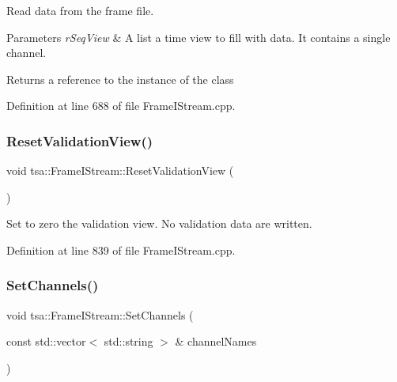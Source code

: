 Read data from the frame file.


\begin{DoxyParams}{Parameters}
{\em r\+Seq\+View} & A list a time view to fill with data. It contains a single channel.\\
\hline
\end{DoxyParams}
\begin{DoxyReturn}{Returns}
a reference to the instance of the class 
\end{DoxyReturn}


Definition at line 688 of file Frame\+I\+Stream.\+cpp.

\mbox{\label{classtsa_1_1_frame_i_stream_a1f12e9321856878c40266cd97890e3d4}} 
\subsubsection{\texorpdfstring{Reset\+Validation\+View()}{ResetValidationView()}}
{\footnotesize\ttfamily void tsa\+::\+Frame\+I\+Stream\+::\+Reset\+Validation\+View (\begin{DoxyParamCaption}{ }\end{DoxyParamCaption})}

Set to zero the validation view. No validation data are written. 

Definition at line 839 of file Frame\+I\+Stream.\+cpp.

\mbox{\label{classtsa_1_1_frame_i_stream_a5f23c61f80f232c70717dd2b021fae6d}} 
\subsubsection{\texorpdfstring{Set\+Channels()}{SetChannels()}}
{\footnotesize\ttfamily void tsa\+::\+Frame\+I\+Stream\+::\+Set\+Channels (\begin{DoxyParamCaption}\item[{const std\+::vector$<$ std\+::string $>$ \&}]{channel\+Names }\end{DoxyParamCaption})}

